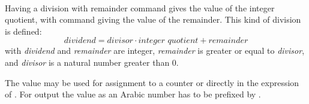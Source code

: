 \begin{Declaration}
  \\
\end{Declaration}%
%
%
Having a division with remainder command
 gives the value of the integer quotient, with command
 giving the value of the remainder. This kind of division is
defined:
\[
\textit{dividend} = \textit{divisor} \cdot
\textit{integer quotient} + \textit{remainder}
\]
with \textit{dividend} and \textit{remainder} are integer, \textit{remainder}
is greater or equal to \textit{divisor}, and \textit{divisor} is a natural
number greater than 0.

The value may be used for assignment to a counter or directly in the
expression of . For output the value as an Arabic number has
to be prefixed by .%
%
%
%
%
%

\endinput


